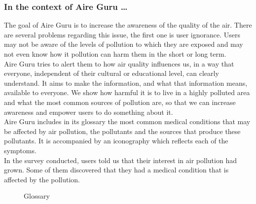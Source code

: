 \subsubsection*{In the context of Aire Guru \ldots}

The goal of Aire Guru is to increase the awareness of the quality of the air.
There are several problems regarding this issue, the first one is user ignorance.
Users may not be aware of the levels of pollution to which they are exposed and may not even know how it pollution can harm them
in the short or long term.\\

Aire Guru tries to alert them to how air quality influences us, in a way that everyone, independent of their cultural or educational level,
can clearly understand.
It aims to make the information, and what that information means, available to everyone.
We show how harmful it is to live in a highly polluted area and what the most common sources of pollution
are, so that we can increase awareness and empower users to do something about it.\\

Aire Guru includes in its glossary the most common medical conditions that may be affected by air pollution, the pollutants and the sources that produce these pollutants.
It is accompanied by an iconography which reflects each of the symptoms. \\

In the survey conducted, users told us that their interest in air pollution had grown.
Some of them discovered that they had a medical condition that is affected by the pollution. \\

\begin{figure}[ht]
    \centering
    \hfill
    \caption{Glossary}
\end{figure}